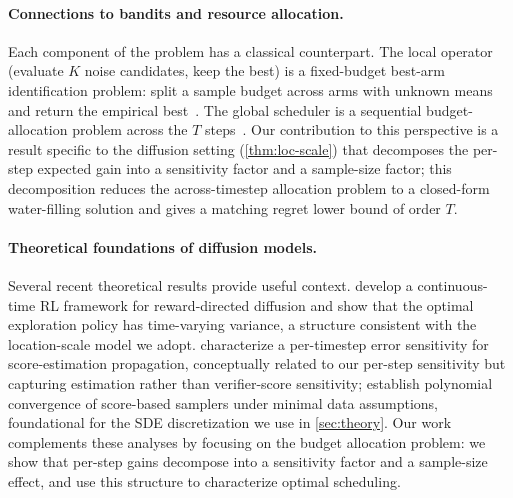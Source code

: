 \paragraph{Connections to bandits and resource allocation.}
Each component of the problem has a classical counterpart.
The local operator (evaluate $K$ noise candidates, keep the best) is a fixed-budget best-arm identification problem: split a sample budget across arms with unknown means and return the empirical best~\citep{chen2000simulation,kaufmann2016complexity,lattimore2020bandit}.
The global scheduler is a sequential budget-allocation problem across the $T$ steps~\citep{ibaraki1988resource,boyd2004convex}.
Our contribution to this perspective is a result specific to the diffusion setting (\cref{thm:loc-scale}) that decomposes the per-step expected gain into a sensitivity factor and a sample-size factor; this decomposition reduces the across-timestep allocation problem to a closed-form water-filling solution and gives a matching regret lower bound of order $T$.

\paragraph{Theoretical foundations of diffusion models.}
Several recent theoretical results provide useful context.
\citet{gao2024reward} develop a continuous-time RL framework for reward-directed diffusion and show that the optimal exploration policy has time-varying variance, a structure consistent with the location-scale model we adopt.
\citet{tang2024contractive} characterize a per-timestep error sensitivity for score-estimation propagation, conceptually related to our per-step sensitivity but capturing estimation rather than verifier-score sensitivity; \citet{chen2023sampling} establish polynomial convergence of score-based samplers under minimal data assumptions, foundational for the SDE discretization we use in \cref{sec:theory}.
Our work complements these analyses by focusing on the budget allocation problem: we show that per-step gains decompose into a sensitivity factor and a sample-size effect, and use this structure to characterize optimal scheduling.
